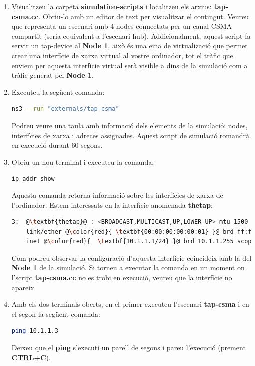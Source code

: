 \documentclass[12pt,a4paper]{article}
\begin{document}
\begin{enumerate}
\item Visualitzeu la carpeta \textbf{simulation-scripts} i localitzeu els arxius: \textbf{tap-csma.cc}. Obriu-lo amb un editor de text per visualitzar el contingut.
Veureu que representa un escenari amb 4 nodes connectats per un canal CSMA compartit (seria equivalent a l'escenari hub).
\newline
Addicionalment, aquest script fa servir un tap-device al \textbf{Node 1}, això és una eina de virtualizació
que permet crear una interfície de xarxa virtual al vostre ordinador, tot el tràfic que enviem per aquesta interfície virtual
serà visible a dins de la simulació com a tràfic generat pel \textbf{Node 1}.

\item Executeu la següent comanda: 
\begin{lstlisting}[language=bash]
ns3 --run "externals/tap-csma" 
\end{lstlisting}
Podreu veure una taula amb informació dels elements de la simulació: nodes, interfícies de xarxa i adreces assignades. Aquest script de simulació romandrà en execució durant 60 segons.
\item Obriu un nou terminal i executeu la comanda:
\begin{lstlisting}[language=bash]
ip addr show
\end{lstlisting}
Aquesta comanda retorna informació sobre les interfícies de xarxa de l'ordinador. Estem interessats en la interfície anomenada \textbf{thetap}:

\begin{lstlisting}[escapechar=@,language=bash,basicstyle=\footnotesize]
3:  @\textbf{thetap}@ : <BROADCAST,MULTICAST,UP,LOWER_UP> mtu 1500 qdisc fq_codel 
    link/ether @\color{red}{ \textbf{00:00:00:00:00:01} }@ brd ff:ff:ff:ff:ff:ff
    inet @\color{red}{  \textbf{10.1.1.1/24} }@ brd 10.1.1.255 scope global thetap
\end{lstlisting}

Com podreu observar la configuració d'aquesta interfície coincideix amb la del \textbf{Node 1} de la simulació.
Si torneu a executar la comanda en un moment on l'script \textbf{tap-csma.cc} no es trobi en execució,
veureu que la interfície no apareix.

\item Amb els dos terminals oberts, en el primer executeu l'escenari  \textbf{tap-csma} i en el segon la següent comanda:
\begin{lstlisting}[language=bash]
ping 10.1.1.3
\end{lstlisting}
Deixeu que el \textbf{ping} s'executi un parell de segons i pareu l'execució (prement \textbf{CTRL+C}).


\end{enumerate}
\end{document}
